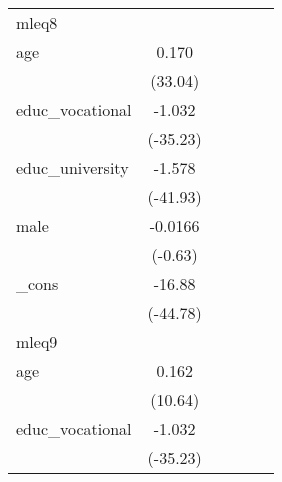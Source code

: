 {\begin{tabular}{l*{5}{c}}
\hline
mleq8       &                     &                     &                     &                     &                     \\
age         &       0.170\sym{***}&                     &                     &                     &                     \\
            &     (33.04)         &                     &                     &                     &                     \\
[1em]
educ\_vocational&      -1.032\sym{***}&                     &                     &                     &                     \\
            &    (-35.23)         &                     &                     &                     &                     \\
[1em]
educ\_university&      -1.578\sym{***}&                     &                     &                     &                     \\
            &    (-41.93)         &                     &                     &                     &                     \\
[1em]
male        &     -0.0166         &                     &                     &                     &                     \\
            &     (-0.63)         &                     &                     &                     &                     \\
[1em]
\_cons      &      -16.88\sym{***}&                     &                     &                     &                     \\
            &    (-44.78)         &                     &                     &                     &                     \\
\hline
mleq9       &                     &                     &                     &                     &                     \\
age         &       0.162\sym{***}&                     &                     &                     &                     \\
            &     (10.64)         &                     &                     &                     &                     \\
[1em]
educ\_vocational&      -1.032\sym{***}&                     &                     &                     &                     \\
            &    (-35.23)         &                     &                     &                     &                     \\

\end{tabular}}
